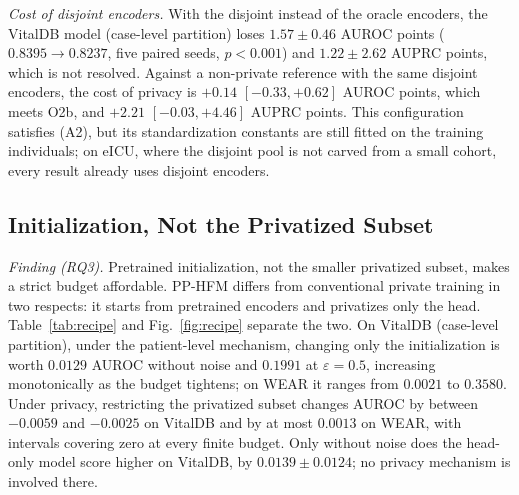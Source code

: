 \emph{Cost of disjoint encoders.} With the disjoint instead of the oracle
encoders, the VitalDB model (case-level partition) loses $1.57 \pm 0.46$ AUROC points
($0.8395 \rightarrow 0.8237$, five paired seeds, $p < 0.001$) and
$1.22 \pm 2.62$ AUPRC points, which is not resolved. Against a non-private
reference with the same disjoint encoders, the cost of privacy is
$+0.14$ $[-0.33, +0.62]$ AUROC points, which meets O2b, and $+2.21$
$[-0.03, +4.46]$ AUPRC points.
This configuration satisfies (A2), but its standardization constants are still
fitted on the training individuals; on eICU, where the disjoint pool is not
carved from a small cohort, every result already uses disjoint encoders.

\subsection{Initialization, Not the Privatized Subset}
\label{sec:results:recipe}
\emph{Finding (RQ3).} Pretrained initialization, not the smaller privatized
subset, makes a strict budget affordable. PP-HFM differs from conventional
private training in two respects: it starts from pretrained encoders and
privatizes only the head.
Table~\ref{tab:recipe} and Fig.~\ref{fig:recipe} separate the two. On VitalDB
(case-level partition), under the patient-level mechanism, changing only the initialization is worth
$0.0129$ AUROC without noise and $0.1991$ at $\varepsilon = 0.5$, increasing
monotonically as the budget tightens; on WEAR it ranges from $0.0021$ to
$0.3580$. Under privacy, restricting the privatized subset changes AUROC by
between $-0.0059$ and $-0.0025$ on VitalDB and by at most $0.0013$ on WEAR,
with intervals covering zero at every finite budget. Only without noise does
the head-only model score higher on VitalDB, by $0.0139 \pm 0.0124$; no privacy
mechanism is involved there.

